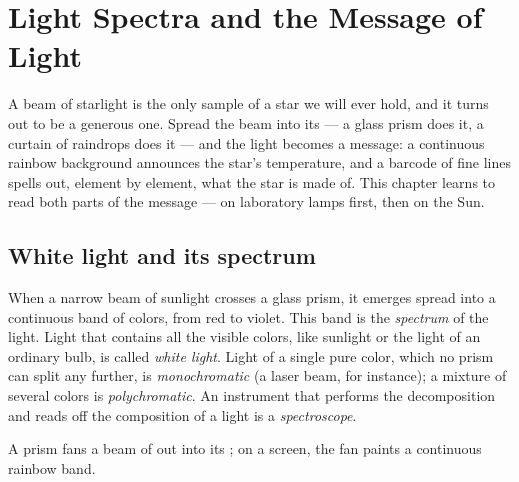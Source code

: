 \chapter{Light Spectra and the Message of Light}\label{ch:g10:light-spectra}

A beam of starlight is the only sample of a star we will ever hold, and it
turns out to be a generous one. Spread the beam into its  --- a
glass prism does it, a curtain of raindrops does it --- and the light
becomes a message: a continuous rainbow background announces the star's
temperature, and a barcode of fine lines spells out, element by element,
what the star is made of. This chapter learns to read both parts of the
message --- on laboratory lamps first, then on the Sun.

\section{White light and its spectrum}

\begin{definition}\label{def:g10:light-spectra:white}
When a narrow beam of sunlight crosses a glass prism, it emerges spread
into a continuous band of colors, from red to violet. This band is the
\emph{spectrum} of the light. Light that contains all the
visible colors, like sunlight or the light of an ordinary bulb, is called
\emph{white light}. Light of a single pure color, which
no prism can split any further, is
\emph{monochromatic} (a laser beam, for
instance); a mixture of several colors is
\emph{polychromatic}. An instrument that
performs the decomposition and reads off the composition of a light is a
\emph{spectroscope}.
\end{definition}

\begin{omfigure}

{\small A prism fans a beam of  out into its ; on a
screen, the fan paints a continuous rainbow band.}
\end{omfigure}

